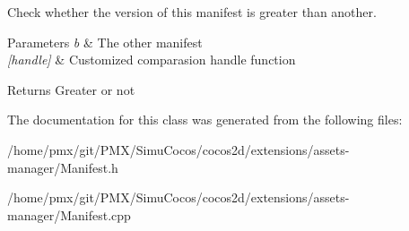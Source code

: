 Check whether the version of this manifest is greater than another. 


\begin{DoxyParams}{Parameters}
{\em b} & The other manifest \\
\hline
{\em \mbox{[}handle\mbox{]}} & Customized comparasion handle function \\
\hline
\end{DoxyParams}
\begin{DoxyReturn}{Returns}
Greater or not 
\end{DoxyReturn}


The documentation for this class was generated from the following files\+:\begin{DoxyCompactItemize}
\item 
/home/pmx/git/\+P\+M\+X/\+Simu\+Cocos/cocos2d/extensions/assets-\/manager/Manifest.\+h\item 
/home/pmx/git/\+P\+M\+X/\+Simu\+Cocos/cocos2d/extensions/assets-\/manager/Manifest.\+cpp\end{DoxyCompactItemize}
